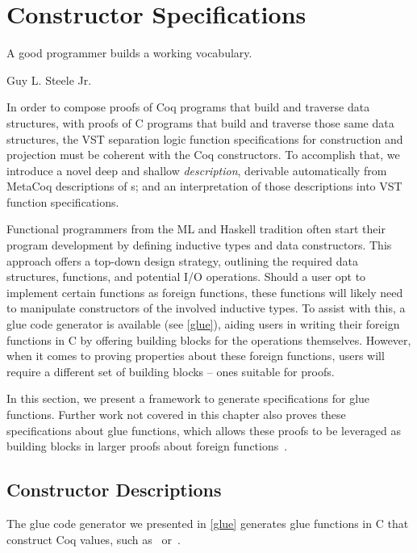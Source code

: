 \chapter{Constructor Specifications}
\label{ctorspecs}

\epigraph{A good programmer builds a working vocabulary.}{Guy L. Steele Jr.~\cite{steele1998growing}}

In order to compose proofs of Coq programs that build and traverse data structures, with proofs of C programs that build and traverse those same data structures, the VST separation logic function specifications for construction and projection must be coherent with the Coq constructors. To accomplish that, we introduce a novel deep and shallow \emph{\constructor{} description}, derivable automatically from MetaCoq descriptions of s; and an interpretation of those \constructor{} descriptions into VST function specifications.

Functional programmers from the ML and Haskell tradition often start their program development by defining \gls{inductive type}s and \gls{data constructor}s. This approach offers a top-down design strategy, outlining the required data structures, functions, and potential I/O operations. Should a user opt to implement certain functions as \gls{foreign function}s, these functions will likely need to manipulate constructors of the involved inductive types. To assist with this, a glue code generator is available (see \autoref{glue}), aiding users in writing their \gls{foreign function}s in C by offering building blocks for the operations themselves. However, when it comes to proving properties about these \gls{foreign function}s, users will require a different set of building blocks – ones suitable for proofs. 

\newpage
In this section, we present a framework to generate specifications for glue functions. Further work not covered in this chapter also proves these specifications about glue functions, which allows these proofs to be leveraged as building blocks in larger proofs about \gls{foreign function}s~\cite{korkutStarkAppel}.

\section{Constructor Descriptions}
\label{ctordesc}

The glue code generator we presented in \autoref{glue} generates glue functions in C that construct Coq values, such as \makenil{}\, or \,\allocmakecons{}.

